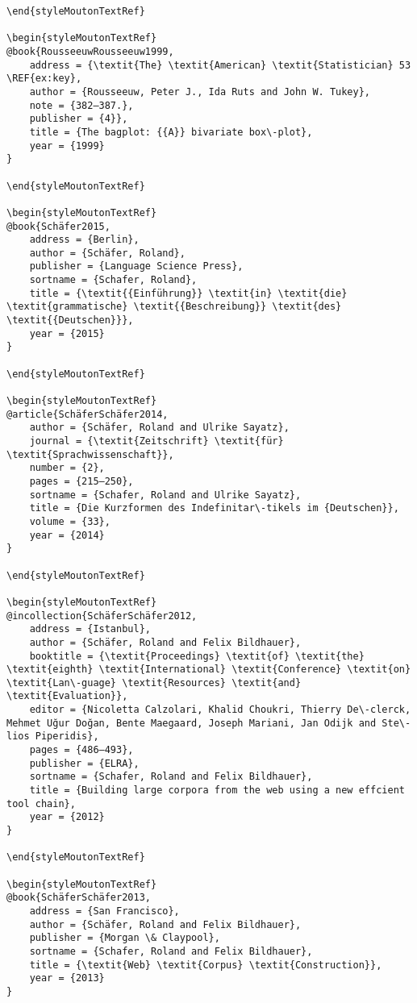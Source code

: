 \begin{styleMoutonHeadingi}
\begin{verbatim}
\end{styleMoutonTextRef}

\begin{styleMoutonTextRef}
@book{RousseeuwRousseeuw1999,
	address = {\textit{The} \textit{American} \textit{Statistician} 53 \REF{ex:key},
	author = {Rousseeuw, Peter J., Ida Ruts and John W. Tukey},
	note = {382–387.},
	publisher = {4}},
	title = {The bagplot: {{A}} bivariate box\-plot},
	year = {1999}
}

\end{styleMoutonTextRef}

\begin{styleMoutonTextRef}
@book{Schäfer2015,
	address = {Berlin},
	author = {Schäfer, Roland},
	publisher = {Language Science Press},
	sortname = {Schafer, Roland},
	title = {\textit{{Einführung}} \textit{in} \textit{die} \textit{grammatische} \textit{{Beschreibung}} \textit{des} \textit{{Deutschen}}},
	year = {2015}
}

\end{styleMoutonTextRef}

\begin{styleMoutonTextRef}
@article{SchäferSchäfer2014,
	author = {Schäfer, Roland and Ulrike Sayatz},
	journal = {\textit{Zeitschrift} \textit{für} \textit{Sprachwissenschaft}},
	number = {2},
	pages = {215–250},
	sortname = {Schafer, Roland and Ulrike Sayatz},
	title = {Die Kurzformen des Indefinitar\-tikels im {Deutschen}},
	volume = {33},
	year = {2014}
}

\end{styleMoutonTextRef}

\begin{styleMoutonTextRef}
@incollection{SchäferSchäfer2012,
	address = {Istanbul},
	author = {Schäfer, Roland and Felix Bildhauer},
	booktitle = {\textit{Proceedings} \textit{of} \textit{the} \textit{eighth} \textit{International} \textit{Conference} \textit{on} \textit{Lan\-guage} \textit{Resources} \textit{and} \textit{Evaluation}},
	editor = {Nicoletta Calzolari, Khalid Choukri, Thierry De\-clerck, Mehmet Uğur Doğan, Bente Maegaard, Joseph Mariani, Jan Odijk and Ste\-lios Piperidis},
	pages = {486–493},
	publisher = {ELRA},
	sortname = {Schafer, Roland and Felix Bildhauer},
	title = {Building large corpora from the web using a new effcient tool chain},
	year = {2012}
}

\end{styleMoutonTextRef}

\begin{styleMoutonTextRef}
@book{SchäferSchäfer2013,
	address = {San Francisco},
	author = {Schäfer, Roland and Felix Bildhauer},
	publisher = {Morgan \& Claypool},
	sortname = {Schafer, Roland and Felix Bildhauer},
	title = {\textit{Web} \textit{Corpus} \textit{Construction}},
	year = {2013}
}


\end{verbatim}
\end{styleMoutonHeadingi}
